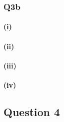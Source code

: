 \subsubsection{Q3b}
\paragraph{(i)}
\paragraph{(ii)}
\paragraph{(iii)}
\paragraph{(iv)}
\subsection{Question 4}
